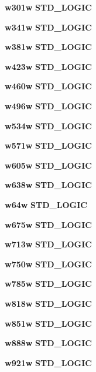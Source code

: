 \begin{DoxyCompactItemize}
{\bf w301w} {\bfseries \textcolor{comment}{S\+T\+D\+\_\+\+L\+O\+G\+IC}\textcolor{vhdlchar}{ }} 
\item 
{\bf w341w} {\bfseries \textcolor{comment}{S\+T\+D\+\_\+\+L\+O\+G\+IC}\textcolor{vhdlchar}{ }} 
\item 
{\bf w381w} {\bfseries \textcolor{comment}{S\+T\+D\+\_\+\+L\+O\+G\+IC}\textcolor{vhdlchar}{ }} 
\item 
{\bf w423w} {\bfseries \textcolor{comment}{S\+T\+D\+\_\+\+L\+O\+G\+IC}\textcolor{vhdlchar}{ }} 
\item 
{\bf w460w} {\bfseries \textcolor{comment}{S\+T\+D\+\_\+\+L\+O\+G\+IC}\textcolor{vhdlchar}{ }} 
\item 
{\bf w496w} {\bfseries \textcolor{comment}{S\+T\+D\+\_\+\+L\+O\+G\+IC}\textcolor{vhdlchar}{ }} 
\item 
{\bf w534w} {\bfseries \textcolor{comment}{S\+T\+D\+\_\+\+L\+O\+G\+IC}\textcolor{vhdlchar}{ }} 
\item 
{\bf w571w} {\bfseries \textcolor{comment}{S\+T\+D\+\_\+\+L\+O\+G\+IC}\textcolor{vhdlchar}{ }} 
\item 
{\bf w605w} {\bfseries \textcolor{comment}{S\+T\+D\+\_\+\+L\+O\+G\+IC}\textcolor{vhdlchar}{ }} 
\item 
{\bf w638w} {\bfseries \textcolor{comment}{S\+T\+D\+\_\+\+L\+O\+G\+IC}\textcolor{vhdlchar}{ }} 
\item 
{\bf w64w} {\bfseries \textcolor{comment}{S\+T\+D\+\_\+\+L\+O\+G\+IC}\textcolor{vhdlchar}{ }} 
\item 
{\bf w675w} {\bfseries \textcolor{comment}{S\+T\+D\+\_\+\+L\+O\+G\+IC}\textcolor{vhdlchar}{ }} 
\item 
{\bf w713w} {\bfseries \textcolor{comment}{S\+T\+D\+\_\+\+L\+O\+G\+IC}\textcolor{vhdlchar}{ }} 
\item 
{\bf w750w} {\bfseries \textcolor{comment}{S\+T\+D\+\_\+\+L\+O\+G\+IC}\textcolor{vhdlchar}{ }} 
\item 
{\bf w785w} {\bfseries \textcolor{comment}{S\+T\+D\+\_\+\+L\+O\+G\+IC}\textcolor{vhdlchar}{ }} 
\item 
{\bf w818w} {\bfseries \textcolor{comment}{S\+T\+D\+\_\+\+L\+O\+G\+IC}\textcolor{vhdlchar}{ }} 
\item 
{\bf w851w} {\bfseries \textcolor{comment}{S\+T\+D\+\_\+\+L\+O\+G\+IC}\textcolor{vhdlchar}{ }} 
\item 
{\bf w888w} {\bfseries \textcolor{comment}{S\+T\+D\+\_\+\+L\+O\+G\+IC}\textcolor{vhdlchar}{ }} 
\item 
{\bf w921w} {\bfseries \textcolor{comment}{S\+T\+D\+\_\+\+L\+O\+G\+IC}\textcolor{vhdlchar}{ }} 

\end{DoxyCompactItemize}
